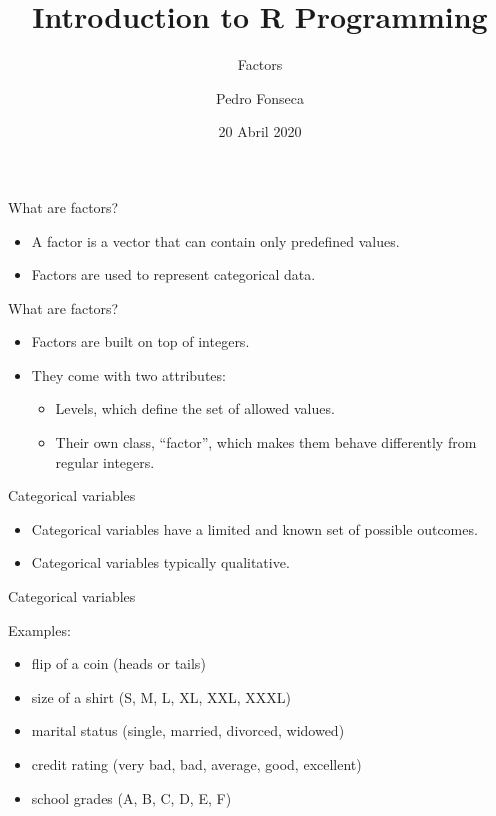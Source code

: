 \documentclass[ignorenonframetext,]{beamer}
\title{Introduction to R Programming}
\subtitle{Factors}
\author{Pedro Fonseca}
\date{20 Abril 2020}
\providecommand{\tightlist}{%
  \setlength{\itemsep}{0pt}\setlength{\parskip}{0pt}}
\begin{document}
\frame{\titlepage}

\begin{frame}{What are factors?}
\protect\hypertarget{what-are-factors}{}

\begin{itemize}
\tightlist
\item
  A factor is a vector that can contain only predefined values.
\item
  Factors are used to represent categorical data.
\end{itemize}

\end{frame}

\begin{frame}{What are factors?}
\protect\hypertarget{what-are-factors-1}{}

\begin{itemize}
\item
  Factors are built on top of integers.
\item
  They come with two attributes:

  \begin{itemize}
  \tightlist
  \item
    Levels, which define the set of allowed values.
  \item
    Their own class, ``factor'', which makes them behave differently
    from regular integers.
  \end{itemize}
\end{itemize}

\end{frame}

\begin{frame}{Categorical variables}
\protect\hypertarget{categorical-variables}{}

\begin{itemize}
\item
  Categorical variables have a limited and known set of possible
  outcomes.
\item
  Categorical variables typically qualitative.
\end{itemize}

\end{frame}

\begin{frame}{Categorical variables}
\protect\hypertarget{categorical-variables-1}{}

Examples:

\begin{itemize}
\tightlist
\item
  flip of a coin (heads or tails)
\item
  size of a shirt (S, M, L, XL, XXL, XXXL)
\item
  marital status (single, married, divorced, widowed)
\item
  credit rating (very bad, bad, average, good, excellent)
\item
  school grades (A, B, C, D, E, F)
\end{itemize}

\end{frame}
\end{document}
